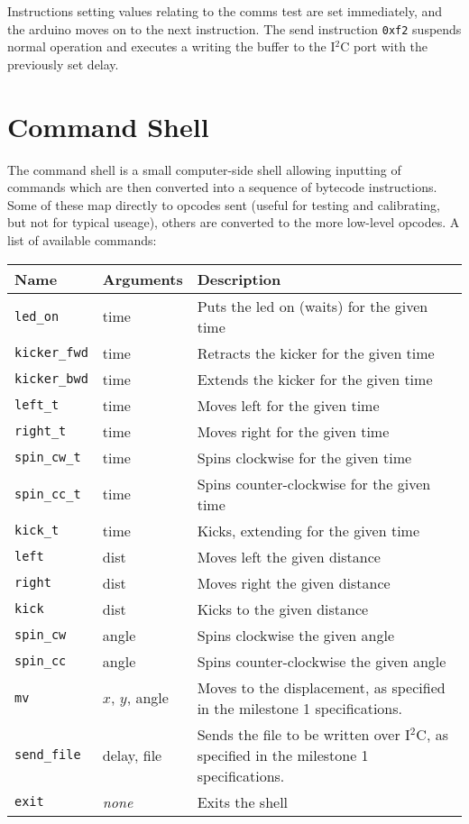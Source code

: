 \documentclass[a4paper]{scrartcl}
\begin{document}
Instructions setting values relating to the comms test are set immediately,
and the arduino moves on to the next instruction. The send instruction
\texttt{0xf2} suspends normal operation and executes a writing the buffer to
the I$^2$C port with the previously set delay.

\section{Command Shell}

The command shell is a small computer-side shell allowing inputting of commands
which are then converted into a sequence of bytecode instructions. Some of
these map directly to opcodes sent (useful for testing and calibrating, but not
for typical useage), others are converted to the more low-level opcodes. A list
of available commands:

\begin{tabularx}{\textwidth}{llX}
    Name & Arguments & Description \\
    \hline
    \verb$led_on$ & time & Puts the led on (waits) for the given time \\
    \verb$kicker_fwd$ & time & Retracts the kicker for the given time \\
    \verb$kicker_bwd$ & time & Extends the kicker for the given time \\
    \verb$left_t$ & time & Moves left for the given time \\
    \verb$right_t$ & time & Moves right for the given time \\
    \verb$spin_cw_t$ & time & Spins clockwise for the given time \\
    \verb$spin_cc_t$ & time & Spins counter-clockwise for the given time \\
    \verb$kick_t$ & time & Kicks, extending for the given time \\
    \verb$left$ & dist & Moves left the given distance \\
    \verb$right$ & dist & Moves right the given distance \\
    \verb$kick$ & dist & Kicks to the given distance \\
    \verb$spin_cw$ & angle & Spins clockwise the given angle \\
    \verb$spin_cc$ & angle & Spins counter-clockwise the given angle \\
    \verb$mv$ & $x$, $y$, angle & Moves to the displacement, as specified in
        the milestone 1 specifications. \\
    \verb$send_file$ & delay, file & Sends the file to be written over I$^2$C,
        as specified in the milestone 1 specifications. \\
    \verb$exit$ & \textit{none} & Exits the shell \\
\end{tabularx}
\end{document}
